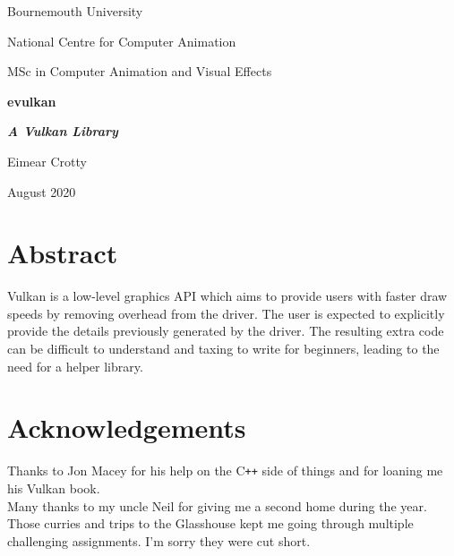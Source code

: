 \documentclass[12pt]{report}
\newcommand{\cpp}{C\texttt{++}}
\theoremstyle{definition}
\begin{document}
  \renewcommand{\familydefault}{\sfdefault}
  \selectfont

  \begin{titlepage}
    \centering
    {\Huge Bournemouth University\par}
    \vspace{0.5cm}
    {\Large National Centre for Computer Animation\par}
    \vspace{0.5cm}
    {\Large MSc in Computer Animation and Visual Effects\par}
    \vspace{5cm}
    {\huge \bfseries evulkan\par}
    \vspace{0.5cm}
    {\Large \bfseries \textit{A Vulkan Library}\par}
    \vspace{2cm}
    {\Large Eimear Crotty\par}
    \vfill
    {\Large August 2020}
  \end{titlepage}

  \chapter*{Abstract}
    Vulkan is a low-level graphics API which aims to provide users with faster
    draw speeds by removing overhead from the driver. The user is expected to
    explicitly provide the details previously generated by the driver. The
    resulting extra code can be difficult to understand and taxing to write
    for beginners, leading to the need for a helper library.

  \chapter*{Acknowledgements}

    \vspace{1cm}
    Thanks to Jon Macey for his help on the \cpp{} side of things and for loaning
    me his Vulkan book.\\
    
    Many thanks to my uncle Neil for giving me a second home during the year. Those curries
    and trips to the Glasshouse kept me going through multiple challenging assignments.
    I'm sorry they were cut short. \\
\end{document}
